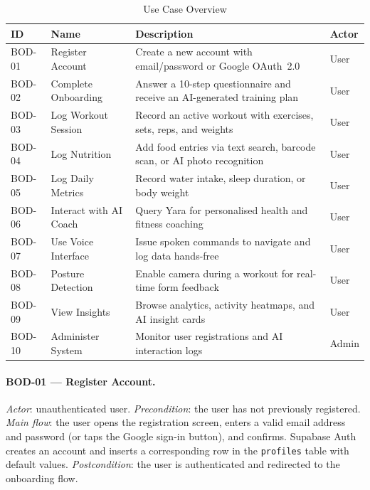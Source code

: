 \begin{table}[H]
	\centering
	\caption{Use Case Overview}
	\label{tab:usecases}
	\begin{tabularx}{\textwidth}{llXl}
		\toprule
		\textbf{ID} & \textbf{Name} & \textbf{Description} & \textbf{Actor} \\
		\midrule
		BOD-01 & Register Account      & Create a new account with email/password or Google OAuth~2.0 & User \\[3pt]
		BOD-02 & Complete Onboarding   & Answer a 10-step questionnaire and receive an AI-generated training plan & User \\[3pt]
		BOD-03 & Log Workout Session   & Record an active workout with exercises, sets, reps, and weights & User \\[3pt]
		BOD-04 & Log Nutrition         & Add food entries via text search, barcode scan, or AI photo recognition & User \\[3pt]
		BOD-05 & Log Daily Metrics     & Record water intake, sleep duration, or body weight & User \\[3pt]
		BOD-06 & Interact with AI Coach & Query Yara for personalised health and fitness coaching & User \\[3pt]
		BOD-07 & Use Voice Interface   & Issue spoken commands to navigate and log data hands-free & User \\[3pt]
		BOD-08 & Posture Detection     & Enable camera during a workout for real-time form feedback & User \\[3pt]
		BOD-09 & View Insights         & Browse analytics, activity heatmaps, and AI insight cards & User \\[3pt]
		BOD-10 & Administer System     & Monitor user registrations and AI interaction logs & Admin \\
		\bottomrule
	\end{tabularx}
\end{table}

\paragraph{BOD-01 — Register Account.}
\textit{Actor}: unauthenticated user.
\textit{Precondition}: the user has not previously registered.
\textit{Main flow}: the user opens the registration screen, enters a valid
email address and password (or taps the Google sign-in button), and
confirms. Supabase Auth creates an account and inserts a corresponding row
in the \texttt{profiles} table with default values.
\textit{Postcondition}: the user is authenticated and redirected to the
onboarding flow.

